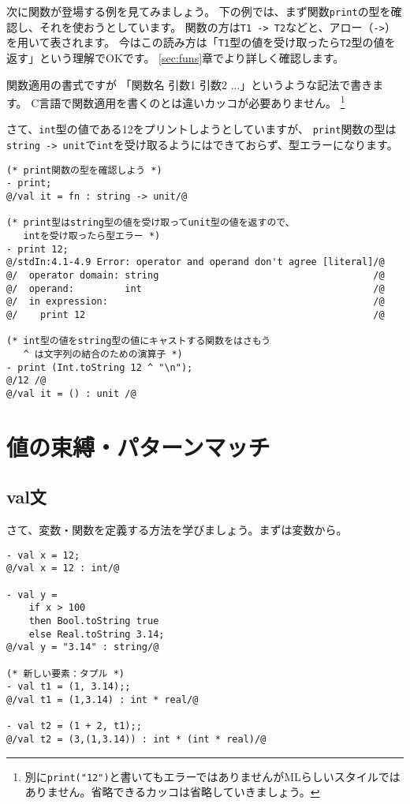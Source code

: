 \documentclass[11pt,a4paper]{article}
\begin{document}
次に関数が登場する例を見てみましょう。
下の例では、まず関数\lstinline{print}の型を確認し、それを使おうとしています。
関数の方は\lstinline{T1 -> T2}などと、アロー（\lstinline{->}）を用いて表されます。
今はこの読み方は「\lstinline{T1}型の値を受け取ったら\lstinline{T2}型の値を返す」という理解でOKです。
\ref{sec:funs}章でより詳しく確認します。

関数適用の書式ですが 「関数名 引数1 引数2 ...」というような記法で書きます。
C言語で関数適用を書くのとは違いカッコが必要ありません。
\footnote{別に\lstinline{print("12")}と書いてもエラーではありませんがMLらしいスタイルではありません。省略できるカッコは省略していきましょう。}

さて、\lstinline{int}型の値である12をプリントしようとしていますが、
\lstinline{print}関数の型は\lstinline{string -> unit}で\lstinline{int}を受け取るようにはできておらず、型エラーになります。

\begin{lstlisting}[caption=型エラー２,label=code:type-error2]
(* print関数の型を確認しよう *)
- print;
@/val it = fn : string -> unit/@

(* print型はstring型の値を受け取ってunit型の値を返すので、
   intを受け取ったら型エラー *)
- print 12;
@/stdIn:4.1-4.9 Error: operator and operand don't agree [literal]/@
@/  operator domain: string                                      /@
@/  operand:         int                                         /@
@/  in expression:                                               /@
@/    print 12                                                   /@

(* int型の値をstring型の値にキャストする関数をはさもう
   ^ は文字列の結合のための演算子 *)
- print (Int.toString 12 ^ "\n");
@/12 /@
@/val it = () : unit /@
\end{lstlisting}


\section{値の束縛・パターンマッチ}
\subsection{val文}
さて、変数・関数を定義する方法を学びましょう。まずは変数から。
\begin{lstlisting}[caption={val文}, label={code:vals}]
- val x = 12;
@/val x = 12 : int/@

- val y =
    if x > 100
    then Bool.toString true
    else Real.toString 3.14;
@/val y = "3.14" : string/@

(* 新しい要素：タプル *)
- val t1 = (1, 3.14);;
@/val t1 = (1,3.14) : int * real/@

- val t2 = (1 + 2, t1);;
@/val t2 = (3,(1,3.14)) : int * (int * real)/@
\end{lstlisting}
\end{document}
